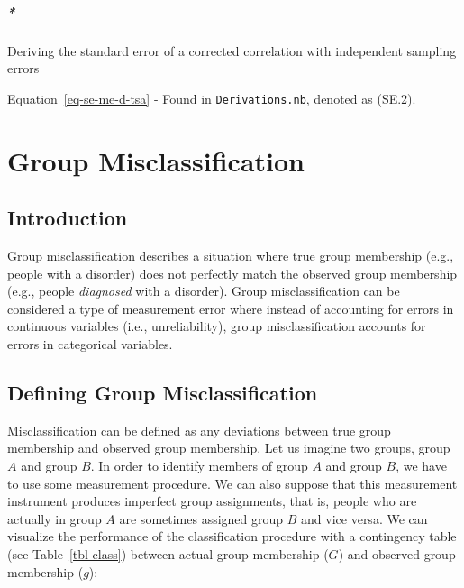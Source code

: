 \documentclass[
  letterpaper,
  DIV=11,
  numbers=noendperiod]{scrreprt}
\let\oldparagraph\paragraph
\renewcommand{\paragraph}[1]{\oldparagraph{#1}\mbox{}}
\begin{document}
\hypertarget{deriving-the-standard-error-of-a-corrected-correlation-with-independent-sampling-errors-1}{%
\paragraph*{Deriving the standard error of a corrected correlation with
independent sampling
errors}\label{deriving-the-standard-error-of-a-corrected-correlation-with-independent-sampling-errors-1}}

Equation~\ref{eq-se-me-d-tsa} - Found in \texttt{Derivations.nb},
denoted as (SE.2).

\hypertarget{group-misclassification}{%
\chapter{Group Misclassification}\label{group-misclassification}}

\hypertarget{introduction-2}{%
\section{Introduction}\label{introduction-2}}

Group misclassification describes a situation where true group
membership (e.g., people with a disorder) does not perfectly match the
observed group membership (e.g., people \emph{diagnosed} with a
disorder). Group misclassification can be considered a type of
measurement error where instead of accounting for errors in continuous
variables (i.e., unreliability), group misclassification accounts for
errors in categorical variables.

\hypertarget{defining-group-misclassification}{%
\section{Defining Group
Misclassification}\label{defining-group-misclassification}}

Misclassification can be defined as any deviations between true group
membership and observed group membership. Let us imagine two groups,
group \(A\) and group \(B\). In order to identify members of group \(A\)
and group \(B\), we have to use some measurement procedure. We can also
suppose that this measurement instrument produces imperfect group
assignments, that is, people who are actually in group \(A\) are
sometimes assigned group \(B\) and vice versa. We can visualize the
performance of the classification procedure with a contingency table
(see Table~\ref{tbl-class}) between actual group membership (\(G\)) and
observed group membership (\(g\)):
\end{document}
